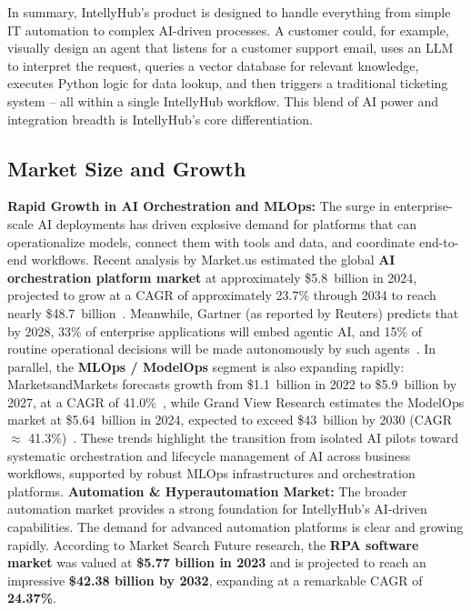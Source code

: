 In summary, IntellyHub's product is designed to handle everything from simple IT automation to complex AI-driven processes. A customer could, for example, visually design an agent that listens for a customer support email, uses an LLM to interpret the request, queries a vector database for relevant knowledge, executes Python logic for data lookup, and then triggers a traditional ticketing system – all within a single IntellyHub workflow. This blend of AI power and integration breadth is IntellyHub's core differentiation.

\subsection{Market Size and Growth}
\textbf{Rapid Growth in AI Orchestration and MLOps:} The surge in enterprise-scale AI deployments has driven explosive demand for platforms that can operationalize models, connect them with tools and data, and coordinate end-to-end workflows.  
Recent analysis by Market.us estimated the global \textbf{AI orchestration platform market} at approximately \$5.8~billion in 2024, projected to grow at a CAGR of approximately 23.7\% through 2034 to reach nearly \$48.7~billion~\cite{AIOrch}.  
Meanwhile, Gartner (as reported by Reuters) predicts that by 2028, 33\% of enterprise applications will embed agentic AI, and 15\% of routine operational decisions will be made autonomously by such agents~\cite{GartnerAgentic}.  
In parallel, the \textbf{MLOps / ModelOps} segment is also expanding rapidly: MarketsandMarkets forecasts growth from \$1.1~billion in 2022 to \$5.9~billion by 2027, at a CAGR of 41.0\%~\cite{MLOpsMM}, while Grand View Research estimates the ModelOps market at \$5.64~billion in 2024, expected to exceed \$43~billion by 2030 (CAGR $\approx$ 41.3\%)~\cite{ModelOpsGV}.  
These trends highlight the transition from isolated AI pilots toward systematic orchestration and lifecycle management of AI across business workflows, supported by robust MLOps infrastructures and orchestration platforms.\newline\newline
\textbf{Automation \& Hyperautomation Market:} The broader automation market provides a strong foundation for IntellyHub's AI-driven capabilities. The demand for advanced automation platforms is clear and growing rapidly. According to Market Search Future research, the \textbf{RPA software market} was valued at \textbf{\$5.77 billion in 2023} and is projected to reach an impressive \textbf{\$42.38 billion by 2032}, expanding at a remarkable CAGR of \textbf{24.37\%}\cite{mrfRPA}.


